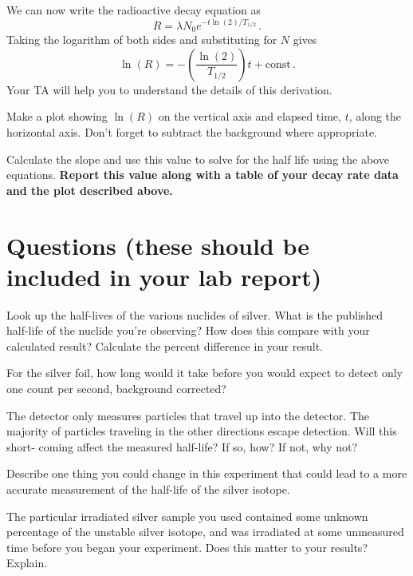 We can now write the radioactive decay equation as
\begin{equation}
 R = \lambda N_0 e^{-t \ln(2) / T_{1/2}} \,.
\end{equation}
Taking the logarithm of both sides and substituting for $N$ gives
\begin{equation}
 \ln(R) = - \left(\frac{\ln(2)}{T_{1/2}} \right) t + \mathrm{const} \,.
\end{equation}
Your TA will help you to understand the details of this derivation.

\begin{steps}
	\item Make a plot showing $\ln(R)$ on the vertical axis and elapsed time, $t$, along the horizontal axis. Don’t forget to subtract the background where appropriate.

	\item Calculate the slope and use this value to solve for the half life using the above equations. \textbf{Report this value along with a table of your decay rate data and the plot described above.}
\end{steps}

\section{Questions (these should be included in your lab report)}

\begin{steps}
	\item Look up the half-lives of the various nuclides of silver. What is the published
	half-life of the nuclide you’re observing? How does this compare with your
	calculated result? Calculate the percent difference in your result.
	
	\item For the silver foil, how long would it take before you would expect to detect only
	one count per second, background corrected?
	
	\item The detector only measures particles that travel up into the detector. The majority
	of particles traveling in the other directions escape detection. Will this short-
	coming affect the measured half-life? If so, how? If not, why not?
	
	\item Describe one thing you could change in this experiment that could lead to a more
	accurate measurement of the half-life of the silver isotope.
	
	\item The particular irradiated silver sample you used contained some unknown
	percentage of the unstable silver isotope, and was irradiated at some unmeasured
	time before you began your experiment. Does this matter to your results? Explain.
	
\end{steps}

